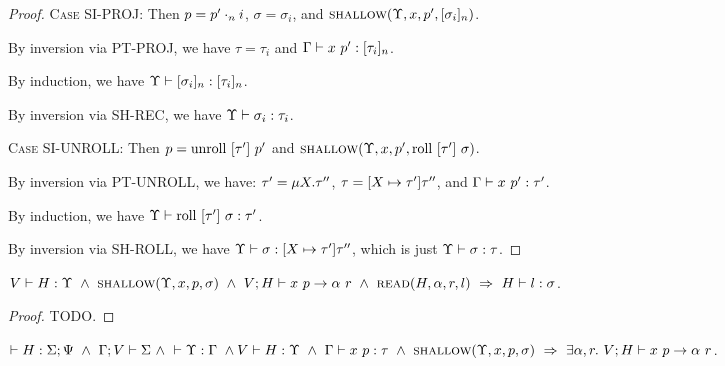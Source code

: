 \documentclass{article}
\begin{document}
\begin{proof}
  \textsc{Case SI-PROJ}:
    Then $p = {p'}\cdot_{n} {i}$, $\sigma = \sigma_i$,
    and $\textsc{shallow}({\Upsilon},{x},{p'},{[ {\sigma_i} ]_{n}})$.

    By inversion via \textsc{PT-PROJ}, we have $\tau = \tau_i$ and 
    ${{\Gamma}} \vdash {{x}\ {p'}} : {{[ {\tau_i} ]_{n}}}$.

    By induction, we have ${\Upsilon} \vdash {[ {\sigma_i} ]_{n}} : {[ {\tau_i} ]_{n}}$.

    By inversion via \textsc{SH-REC}, we have ${\Upsilon} \vdash {\sigma_i} : {\tau_i}$.

  \textsc{Case SI-UNROLL}:
    Then $p = \textrm{unroll}\ [{\tau'}]\ {p'}$ and $\textsc{shallow}({\Upsilon},{x},{p'},{\textrm{roll}\ [{\tau'}]\ {\sigma}})$.

    By inversion via \textsc{PT-UNROLL}, we have: 
    $\tau' = \mu {X}.{\tau''}$,
    $\tau = [{X} \mapsto {\tau'}]{\tau''}$, and
    ${{\Gamma}} \vdash {{x}\ {p'}} : {{\tau'}}$.

    By induction, we have ${\Upsilon} \vdash {\textrm{roll}\ [{\tau'}]\ {\sigma}} : {\tau'}$.

    By inversion via \textsc{SH-ROLL}, we have
    ${\Upsilon} \vdash {\sigma} : {[{X} \mapsto {\tau'}]{\tau''}}$, 
    which is just ${\Upsilon} \vdash {\sigma} : {\tau}$.

\end{proof}

\begin{lem}
  $\Type{V}{H}{\Upsilon}\ \land\ \Shallow{\Upsilon}{x}{p}{\sigma}\ \land\
   \PEval{V}{H}{x}{p}{\alpha}{r}\ \land\ \Read{H}{\alpha}{r}{l}\ \Rightarrow\
   \Type{H}{l}{\sigma}$.
\end{lem}

\begin{proof}
  TODO.
\end{proof}

\begin{lem}
  $\HWF{H}{\Sigma}{\Psi}\ \land\ \SWF{\Gamma}{V}{\Sigma}\ \land\
   \YWF{\Upsilon}{\Gamma}\ \land\ \\ \Type{V}{H}{\Upsilon}\ \land\ 
   \PType{\Gamma}{x}{p}{\tau}\ \land\ \Shallow{\Upsilon}{x}{p}{\sigma}\ 
   \Rightarrow\ \exists \alpha, r.\ \PEval{V}{H}{x}{p}{\alpha}{r}$.
\end{lem}
\end{document}
